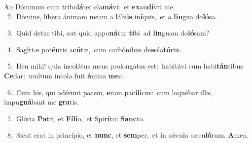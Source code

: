\lettrine{\initial\textcolor{\initialcolor}{A}}{d} Dóminum cum tribu\-\textbf{lá}\-rer cla\-\textbf{má}\-vi:~\star et \textbf{ex}\-au\-\textbf{dí}\-vit me.\\
{\numbfont\textcolor{\numbcolor}{~2.}}~Dómine, líbera ánimam meam a lábi\textbf{is} in\-\textbf{í}\-quis,~\star et a \textbf{lin}\-gua do\-\textbf{ló}\-sa.\par
{\numbfont\textcolor{\numbcolor}{~3.}}~Quid detur tibi, aut quid appo\-\textbf{ná}\-tur \textbf{ti}\-bi~\star ad \textbf{lin}\-guam do\-\textbf{ló}\-sam?\par
{\numbfont\textcolor{\numbcolor}{~4.}}~Sagíttæ pot\-\textbf{én}\-tis a\-\textbf{cú}\-tæ,~\star cum carbónibus de\-\textbf{so}\-la\-\textbf{tó}\-riis.\par
{\numbfont\textcolor{\numbcolor}{~5.}}~Heu mihi! quia incolátus meus prolongátus est:~\dagger habitávi cum habi\-\textbf{tán}\-tibus \textbf{Ce}\-dar:~\star multum íncola fuit \textbf{á}\-nima \textbf{me}\-a.\par
{\numbfont\textcolor{\numbcolor}{~6.}}~Cum his, qui odérunt pacem, \textbf{e}\-ram pa\-\textbf{cí}\-\textbf{fi}cus:~\star cum loquébar illis, impu\-\textbf{gná}\-bant me \textbf{gra}\-tis.\par
{\numbfont\textcolor{\numbcolor}{~7.}}~Glória \textbf{Pa}\-tri, et \textbf{Fí}\-\textbf{li}o,~\star et Spi\-\textbf{rí}\-tui \textbf{Sanc}\-to.\par
{\numbfont\textcolor{\numbcolor}{~8.}}~Sicut erat in princípio, et \textbf{nunc}\-, et \textbf{sem}\-per,~\star et in sǽcula sæcu\-\textbf{ló}\-rum. \textbf{A}\-men.\par
